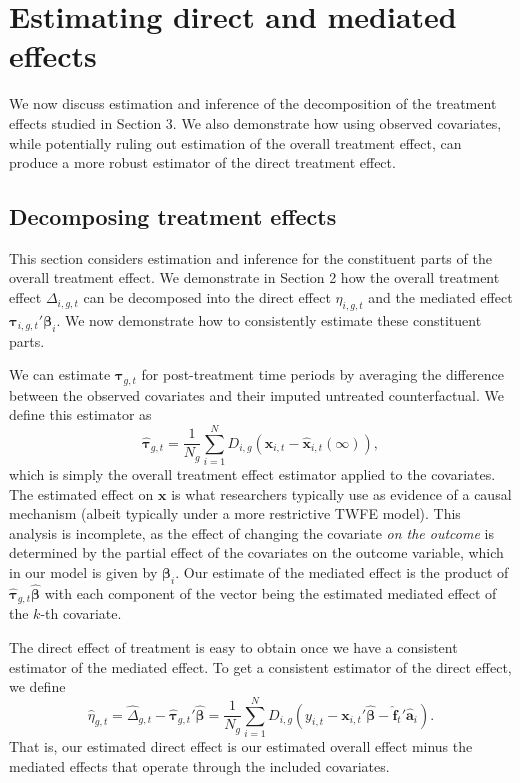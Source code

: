 \documentclass[12pt,fleqn]{article}
\def\*#1{\mathbf{#1}}
\def\+#1{\boldsymbol{#1}}
\begin{document}
\section{Estimating direct and mediated effects}

We now discuss estimation and inference of the decomposition of the treatment effects studied in Section 3. We also demonstrate how using observed covariates, while potentially ruling out estimation of the overall treatment effect, can produce a more robust estimator of the direct treatment effect. 

\subsection{Decomposing treatment effects}

This section considers estimation and inference for the constituent parts of the overall treatment effect. We demonstrate in Section 2 how the overall treatment effect $\Delta_{i,g,t}$ can be decomposed into the direct effect $\eta_{i,g,t}$ and the mediated effect $\+\tau_{i,g,t}' \+\beta_i$. We now demonstrate how to consistently estimate these constituent parts.



We can estimate $\+\tau_{g,t}$ for post-treatment time periods by averaging the difference between the observed covariates and their imputed untreated counterfactual. We define this estimator as
\begin{equation}
    \widehat{\+\tau}_{g,t} = \frac{1}{N_g} \sum_{i = 1}^N D_{i,g} ( \*x_{i,t} - \widehat{\*x}_{i,t}(\infty) ), \label{x treatment effect}
\end{equation}
which is simply the overall treatment effect estimator applied to the covariates. The estimated effect on $\+x$ is what researchers typically use as evidence of a causal mechanism (albeit typically under a more restrictive TWFE model). This analysis is incomplete, as the effect of changing the covariate \emph{on the outcome} is determined by the partial effect of the covariates on the outcome variable, which in our model is given by $\+\beta_i$. Our estimate of the mediated effect is the product of $\widehat{\+\tau}_{g,t} \widehat{\+\beta}$ with each component of the vector being the estimated mediated effect of the $k$-th covariate. 

The direct effect of treatment is easy to obtain once we have a consistent estimator of the mediated effect. To get a consistent estimator of the direct effect, we define 
\begin{equation}
    \widehat{\eta}_{g,t} = \widehat{\Delta}_{g,t} - \widehat{\+\tau}_{g,t}' \widehat{\+\beta} = \frac{1}{N_g} \sum_{i = 1}^N D_{i,g} (y_{i,t} - \*x_{i,t}' \widehat{\+\beta} - \widehat{\*f}_t' \widehat{\*a}_i).
\end{equation}
That is, our estimated direct effect is our estimated overall effect minus the mediated effects that operate through the included covariates.
\end{document}
